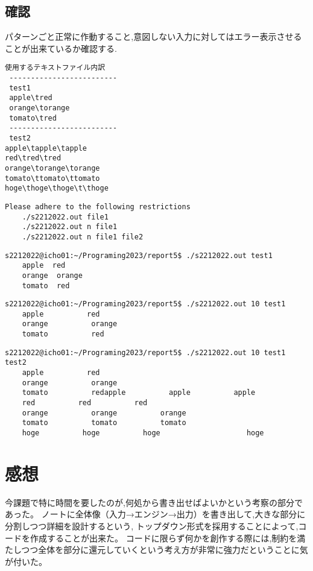 \documentclass[fontsize = 10pt, paper= a4]{jlreq}
\begin{document}
\subsection{確認}
パターンごと正常に作動すること,意図しない入力に対してはエラー表示させることが出来ているか確認する.

\begin{lstlisting}[basicstyle=\ttfamily\footnotesize, frame=single, caption=test1,label=test1]
 使用するテキストファイル内訳
 -------------------------
 test1
 apple\tred
 orange\torange
 tomato\tred
 -------------------------
 test2
apple\tapple\tapple
red\tred\tred
orange\torange\torange
tomato\ttomato\ttomato
hoge\thoge\thoge\t\thoge
\end{lstlisting}

\begin{lstlisting}[basicstyle=\ttfamily\footnotesize, frame=single, caption=test2,label=test2]
    Please adhere to the following restrictions
    ./s2212022.out file1
    ./s2212022.out n file1
    ./s2212022.out n file1 file2    
\end{lstlisting}

\begin{lstlisting}[basicstyle=\ttfamily\footnotesize, frame=single, caption=test3,label=test3]
    s2212022@icho01:~/Programing2023/report5$ ./s2212022.out test1 
    apple  red
    orange  orange
    tomato  red    
\end{lstlisting}

\begin{lstlisting}[basicstyle=\ttfamily\footnotesize, frame=single, caption=test4,label=test4]
    s2212022@icho01:~/Programing2023/report5$ ./s2212022.out 10 test1 
    apple          red
    orange          orange
    tomato          red    
\end{lstlisting}

\begin{lstlisting}[basicstyle=\ttfamily\footnotesize, frame=single, caption=test5,label=test5]
    s2212022@icho01:~/Programing2023/report5$ ./s2212022.out 10 test1 test2
    apple          red
    orange          orange
    tomato          redapple          apple          apple
    red          red          red
    orange          orange          orange
    tomato          tomato          tomato
    hoge          hoge          hoge                    hoge
\end{lstlisting}


\section{感想}
今課題で特に時間を要したのが,何処から書き出せばよいかという考察の部分であった。
ノートに全体像（入力→エンジン→出力）を書き出して,大きな部分に分割しつつ詳細を設計するという,
トップダウン形式を採用することによって,コードを作成することが出来た。
コードに限らず何かを創作する際には,制約を満たしつつ全体を部分に還元していくという考え方が非常に強力だということに気が付いた。




\end{document}
